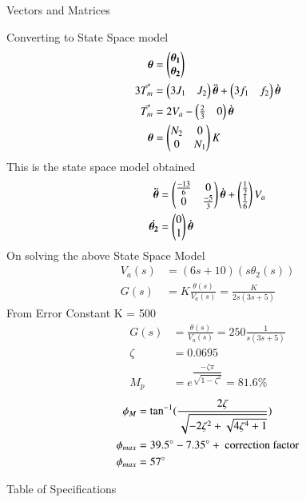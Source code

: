 \begin{table}[!ht]
\centering

\caption{Vectors and Matrices}
\label{table:ee18btech11001_4}
\end{table}    
Converting to State Space model
\begin{align}
    \bm{\theta} &= \begin{pmatrix}\bm{\theta_{1}} \\ \bm{\theta_{2}}\end{pmatrix}
    \\
    3 \Vec{T_{m}} &= \begin{pmatrix}3J_{1} & J_{2}\end{pmatrix}\bm{\Ddot{\theta}}+ \begin{pmatrix}3f_{1} & f_{2}\end{pmatrix}\bm{\dot{\theta}}
    \\
    \Vec{T_{m}} &= 2V_{a} - \begin{pmatrix}\frac{2}{3} & 0\end{pmatrix}\bm{\dot{\theta}}
    \\
    \bm{\theta} &= \begin{pmatrix}N_{2} & 0 \\ 0& N_{1}\end{pmatrix} K
\end{align}
This is the state space model obtained
\begin{align}
    \bm{\Ddot{\theta}} &= \begin{pmatrix}\frac{-13}{6} & 0 \\ 0 &\frac{-5}{3}\end{pmatrix}\bm{\Dot{\theta}} + \begin{pmatrix}\frac{1}{2} \\ \frac{1}{6}\end{pmatrix}V_{a}
    \\
    \bm{\dot{\theta_{2}}} &= \begin{pmatrix}0 \\ 1\end{pmatrix}\bm{\dot{\theta}} 
\end{align}
On solving the above State Space Model
\begin{align}
    V_{a}(s) &= (6s+10)(s\theta_{2}(s)) \label{eq:ee18btech11001_6}
    \\
    G(s) &=  K \frac{\theta (s)}{V_{a}(s)} = \frac{K}{2s(3s+5)} \label{eq:ee18btech11001_7}
\end{align}
From Error Constant  K = 500
\begin{align}
   G(s) &=  \frac{\theta (s)}{V_{a}(s)} = 250 \frac{1}{s(3s+5)} \label{eq:ee18btech11001_8}
   \\
   \zeta &= 0.0695
   \\
   M_{p} &= e^{\dfrac{-\zeta\pi}{\sqrt{1-\zeta^{2}}}} = 81.6\%
\end{align}
\begin{align}
   \phi_{M} &= \tan^{-1}(\dfrac{2\zeta}{\sqrt{-2\zeta^2 + \sqrt{4\zeta^4 + 1}}})
   \\
   \phi_{max} &= 39.5\degree-7.35\degree+ \text{ correction factor}
   \\
   \phi_{max} &= 57\degree
\end{align}
\begin{table}[!ht]
\centering

\caption{Table of Specifications}
\label{table:ee18btech11001}
\end{table}


